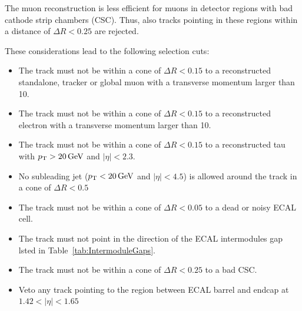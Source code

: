 The muon reconstruction is less efficient for muons in detector regions with bad cathode strip chambers (CSC).
Thus, also tracks pointing in these regions within a distance of $\Delta R<0.25$ are rejected.

These considerations lead to the following selection cuts:

\begin{itemize}
\renewcommand{\labelitemi}{\footnotesize{\ding{118}}}
\item The track must not be within a cone of $\Delta R<0.15$ to a reconstructed standalone, tracker or global muon with a transverse momentum larger than 10\gev.
\item The track must not be within a cone of $\Delta R<0.15$ to a reconstructed electron with a transverse momentum larger than 10\gev.
\item The track must not be within a cone of $\Delta R<0.15$ to a reconstructed tau with $p_{\text{T}}>20\,\text{Ge}\kern-0.06667em\text{V}$ and $|\eta|<2.3$.
\item No subleading jet ($p_{\text{T}}<20\,\text{Ge}\kern-0.06667em\text{V}$ and $|\eta|<4.5$) is allowed around the track in a cone of $\Delta R< 0.5$
\item The track must not be within a cone of $\Delta R<0.05$ to a dead or noisy ECAL cell.
\item The track must not point in the direction of the ECAL intermodules gap lsted in Table~\ref{tab:IntermoduleGaps}.
\item The track must not be within a cone of $\Delta R<0.25$ to a bad CSC.
\item Veto any track pointing to the region between ECAL barrel and endcap at $1.42<|\eta|<1.65$
\end{itemize}

